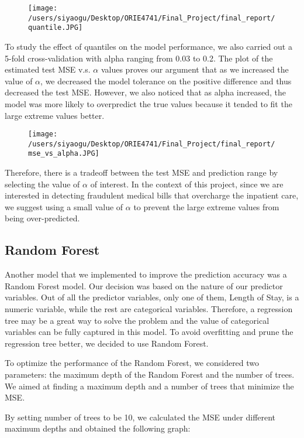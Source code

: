 \documentclass[journal, a4paper,11pt]{IEEEtran}
\begin{document}
	\begin{figure}[ht]
	\centering
	\texttt{[image: /users/siyaogu/Desktop/ORIE4741/Final\_Project/final\_report/quantile.JPG]}
	\end{figure}
	
	To study the effect of quantiles on the model performance, we also carried out a 5-fold cross-validation with alpha ranging from 0.03 to 0.2. The plot of the estimated test MSE v.s. $\alpha$ values proves our argument that as we increased the value of $\alpha$, we decreased the model tolerance on the positive difference and thus decreased the test MSE. However, we also noticed that as alpha increased, the model was more likely to overpredict the true values because it tended to fit the large extreme values better.

	\begin{figure}[ht]
	\centering
	\texttt{[image: /users/siyaogu/Desktop/ORIE4741/Final\_Project/final\_report/mse\_vs\_alpha.JPG]}
	\end{figure}
	
	Therefore, there is a tradeoff between the test MSE and prediction range by selecting the value of $\alpha$ of interest. In the context of this project, since we are interested in detecting fraudulent medical bills that overcharge the inpatient care, we suggest using a small value of $\alpha$ to prevent the large extreme values from being over-predicted.

\subsection{Random Forest}
	Another model that we implemented to improve the prediction accuracy was a Random Forest model. Our decision was based on the nature of our predictor variables. Out of all the predictor variables, only one of them, Length of Stay, is a numeric variable, while the rest are categorical variables. Therefore, a regression tree may be a great way to solve the problem and the value of categorical variables can be fully captured in this model. To avoid overfitting and prune the regression tree better, we decided to use Random Forest.
	
	To optimize the performance of the Random Forest, we considered two parameters: the maximum depth of the Random Forest and the number of trees. We aimed at finding a maximum depth and a number of trees that minimize the MSE.
	
	By setting number of trees to be 10, we calculated the MSE under different maximum depths and obtained the following graph:
\end{document}
